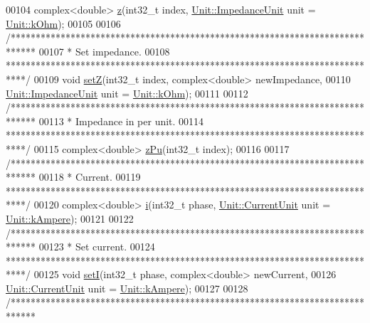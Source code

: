 \begin{DoxyCode}
00104   complex<double>  \hyperlink{group___models_gab5370574fd93e13eb11742f7753fe1f1}{z}(int32\_t index, \hyperlink{class_unit_a3747e779c805df24a71961290be3fbdf}{Unit::ImpedanceUnit} unit = 
      \hyperlink{class_unit_a3747e779c805df24a71961290be3fbdfa6b9c74d1763eefbaf751eeecff0bd9da}{Unit::kOhm});
00105 
00106   \textcolor{comment}{/*****************************************************************************}
00107 \textcolor{comment}{   * Set impedance.}
00108 \textcolor{comment}{   ****************************************************************************/}
00109   \textcolor{keywordtype}{void} \hyperlink{group___models_ga409df7d11f5c5d594a13fb2f74b3b9e0}{setZ}(int32\_t index, complex<double> newImpedance,
00110             \hyperlink{class_unit_a3747e779c805df24a71961290be3fbdf}{Unit::ImpedanceUnit} unit = \hyperlink{class_unit_a3747e779c805df24a71961290be3fbdfa6b9c74d1763eefbaf751eeecff0bd9da}{Unit::kOhm});
00111 
00112   \textcolor{comment}{/*****************************************************************************}
00113 \textcolor{comment}{   * Impedance in per unit.}
00114 \textcolor{comment}{   ****************************************************************************/}
00115   complex<double> \hyperlink{group___models_ga139698332327a712f6c02d96fe73fbee}{zPu}(int32\_t index);
00116 
00117   \textcolor{comment}{/*****************************************************************************}
00118 \textcolor{comment}{   * Current.}
00119 \textcolor{comment}{   ****************************************************************************/}
00120   complex<double> \hyperlink{group___models_gaf81e7055102816465bdf7e19afc2d547}{i}(int32\_t phase, \hyperlink{class_unit_a0794cf6c9682f48296dd4a5315389787}{Unit::CurrentUnit} unit = 
      \hyperlink{class_unit_a0794cf6c9682f48296dd4a5315389787a368a3c470f0b590a6100dda717a7dd4f}{Unit::kAmpere});
00121 
00122   \textcolor{comment}{/*****************************************************************************}
00123 \textcolor{comment}{   * Set current.}
00124 \textcolor{comment}{   ****************************************************************************/}
00125   \textcolor{keywordtype}{void} \hyperlink{group___models_ga9e55b06dc3e385838fdd13d5580438ef}{setI}(int32\_t phase, complex<double> newCurrent,
00126             \hyperlink{class_unit_a0794cf6c9682f48296dd4a5315389787}{Unit::CurrentUnit} unit = \hyperlink{class_unit_a0794cf6c9682f48296dd4a5315389787a368a3c470f0b590a6100dda717a7dd4f}{Unit::kAmpere});
00127 
00128   \textcolor{comment}{/*****************************************************************************}

\end{DoxyCode}
